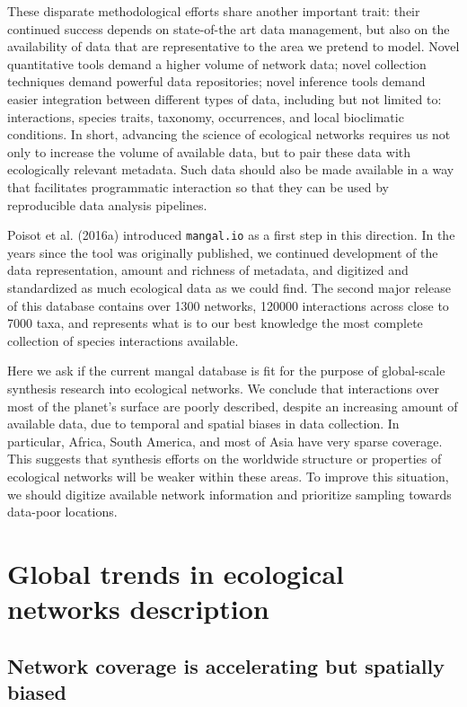 These disparate methodological efforts share another important trait:
their continued success depends on state-of-the art data management, but
also on the availability of data that are representative to the area we
pretend to model. Novel quantitative tools demand a higher volume of
network data; novel collection techniques demand powerful data
repositories; novel inference tools demand easier integration between
different types of data, including but not limited to: interactions,
species traits, taxonomy, occurrences, and local bioclimatic conditions.
In short, advancing the science of ecological networks requires us not
only to increase the volume of available data, but to pair these data
with ecologically relevant metadata. Such data should also be made
available in a way that facilitates programmatic interaction so that
they can be used by reproducible data analysis pipelines.

Poisot et al. (2016a) introduced \texttt{mangal.io} as a first step in
this direction. In the years since the tool was originally published, we
continued development of the data representation, amount and richness of
metadata, and digitized and standardized as much ecological data as we
could find. The second major release of this database contains over 1300
networks, 120000 interactions across close to 7000 taxa, and represents
what is to our best knowledge the most complete collection of species
interactions available.

Here we ask if the current mangal database is fit for the purpose of
global-scale synthesis research into ecological networks. We conclude
that interactions over most of the planet's surface are poorly
described, despite an increasing amount of available data, due to
temporal and spatial biases in data collection. In particular, Africa,
South America, and most of Asia have very sparse coverage. This suggests
that synthesis efforts on the worldwide structure or properties of
ecological networks will be weaker within these areas. To improve this
situation, we should digitize available network information and
prioritize sampling towards data-poor locations.

\hypertarget{global-trends-in-ecological-networks-description}{%
\section{Global trends in ecological networks
description}\label{global-trends-in-ecological-networks-description}}

\hypertarget{network-coverage-is-accelerating-but-spatially-biased}{%
\subsection{Network coverage is accelerating but spatially
biased}\label{network-coverage-is-accelerating-but-spatially-biased}}

